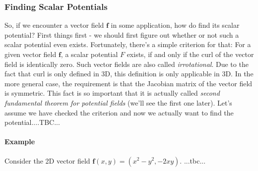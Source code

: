 




\subsubsection{Finding Scalar Potentials}
So, if we encounter a vector field $\mathbf{f}$ in some application, how do find its scalar potential? First things first - we should first figure out whether or not such a scalar potential even exists. Fortunately, there's a simple criterion for that: For a given vector field $\mathbf{f}$, a scalar potential $F$ exists, if and only if the curl of the vector field is identically zero. Such vector fields are also called \emph{irrotational}. Due to the fact that curl is only defined in 3D, this definition is only applicable in 3D. In the more general case, the requirement is that the Jacobian matrix of the vector field is symmetric. This fact is so important that it is actually called \emph{second fundamental theorem for potential fields} (we'll see the first one later). %
Let's assume we have checked the criterion and now we actually want to find the potential....TBC...

\paragraph{Example} Consider the 2D vector field $\mathbf{f}(x,y) = (x^2-y^2, -2 x y)$. ...tbc...



